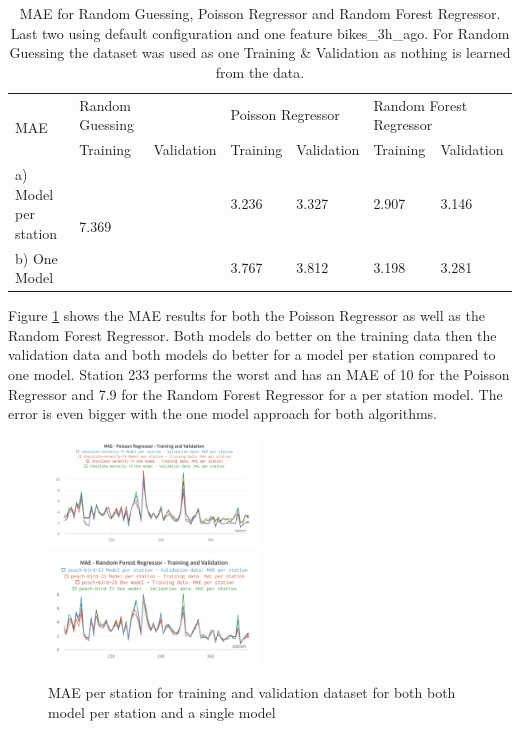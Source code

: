 \documentclass[a4paper]{article}
\begin{document}
    \begin{table}[h]
        \centering
        \begin{tabularx}{\textwidth}{|X|XX|XX|XX|}
            \hline
            \multirow{2}{*}{MAE} & \multicolumn{1}{l|}{Random Guessing} & & \multicolumn{2}{l|}{Poisson Regressor} & \multicolumn{2}{l|}{Random Forest Regressor} \\ \cline{2-7}
            & \multicolumn{1}{l|}{Training} & Validation & \multicolumn{1}{l|}{Training} & Validation & \multicolumn{1}{l|}{Training} & Validation \\ \hline
            a) Model per station & \multicolumn{2}{l|}{\multirow{2}{*}{7.369}} & \multicolumn{1}{l|}{3.236}    & 3.327      & \multicolumn{1}{l|}{2.907}    & 3.146      \\ \cline{1-1} \cline{4-7}
            b) One Model & \multicolumn{2}{l|}{} & \multicolumn{1}{l|}{3.767} & 3.812 & \multicolumn{1}{l|}{3.198}    & 3.281      \\ \hline
        \end{tabularx}
        \caption{MAE for Random Guessing, Poisson Regressor and Random Forest Regressor. Last two using default configuration and one feature bikes\_3h\_ago. For
        Random Guessing the dataset was used as one Training \& Validation as nothing is learned from the data.}
        \label{tbl:phase1-step2-simple-model-mae}
    \end{table}

    Figure \ref{fig:simple-pr-rfr-mae-perstation} shows the MAE results for both the Poisson Regressor as well as the
    Random Forest Regressor. Both models do better on the training data then the validation data and both models do
    better for a model per station compared to one model. Station 233 performs the worst and has an MAE of 10 for the
    Poisson Regressor and 7.9 for the Random Forest Regressor for a per station model. The error is even bigger with the
    one model approach for both algorithms.

    \begin{figure}[h]
        \includegraphics[width=0.5\textwidth]{mae-pr-perstation}\hfill
        \includegraphics[width=0.5\textwidth]{mae-rfr-comparison}
        \caption{MAE per station for training and validation dataset for both both model per station and a single model}
        \label{fig:simple-pr-rfr-mae-perstation}
    \end{figure}
\end{document}
